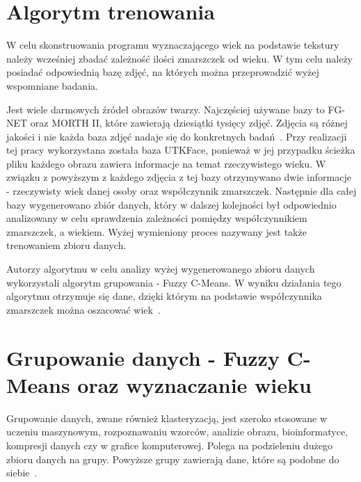 \documentclass[a4paper,twoside,12pt]{book}
\begin{document}
    \section{Algorytm trenowania}\label{sec:algorytmTrenowania}
    W celu skonstruowania programu wyznaczającego wiek na podstawie tekstury należy wcześniej zbadać zależność ilości
    zmarszczek od wieku.
    W tym celu należy posiadać odpowiednią bazę zdjęć, na których można przeprowadzić wyżej wspomniane badania.

    Jest wiele darmowych źródeł obrazów twarzy.
    Najczęściej używane bazy to FG-NET oraz MORTH II, które
    zawierają dziesiątki tysięcy zdjęć.
    Zdjęcia są różnej jakości i nie każda baza zdjęć nadaje się do konkretnych badań~\cite{khryashchevGanin}.
    Przy realizacji tej pracy wykorzystana została baza UTKFace,
    ponieważ w jej przypadku ścieżka pliku każdego obrazu zawiera informacje na temat rzeczywistego wieku.
    W związku z powyższym z każdego zdjęcia z tej bazy otrzymywano dwie informacje - rzeczywisty wiek danej osoby oraz
    współczynnik zmarszczek.
    Następnie dla całej bazy wygenerowano zbiór danych, który w dalszej kolejności był odpowiednio analizowany w celu
    sprawdzenia zależności pomiędzy współczynnikiem zmarszczek, a wiekiem. Wyżej wymieniony proces nazywany jest
    także trenowaniem zbioru danych.

    Autorzy algorytmu w celu analizy wyżej wygenerowanego zbioru danych wykorzystali algorytm grupowania -
    Fuzzy C-Means.
    W wyniku działania tego algorytmu otrzymuje się dane, dzięki którym na podstawie współczynnika zmarszczek można
    oszacować wiek~\cite{wrinkleFeatures}.
    \section{Grupowanie danych - Fuzzy C-Means oraz wyznaczanie wieku}\label{sec:grupowanieDanych}
    Grupowanie danych, zwane również klasteryzacją, jest szeroko stosowane w uczeniu maszynowym, rozpoznawaniu wzorców,
    analizie obrazu, bioinformatyce, kompresji danych czy w grafice komputerowej.
    Polega na podzieleniu dużego zbioru danych na grupy.
    Powyższe grupy zawierają dane, które są podobne do siebie~\cite{clusterWstep}.
\end{document}
